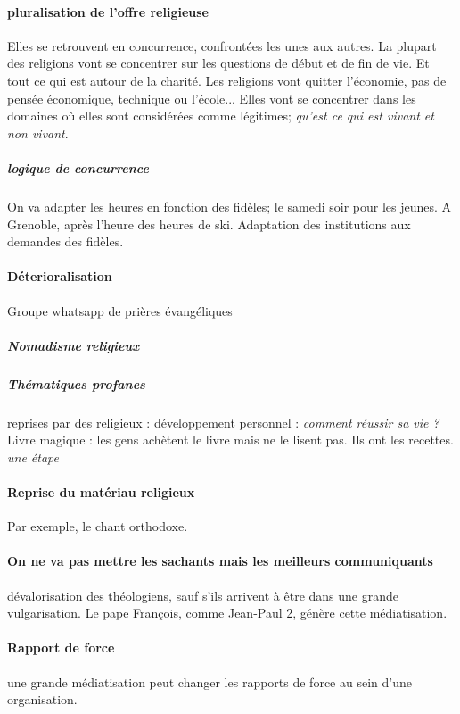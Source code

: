 \paragraph{ pluralisation de l’offre religieuse} Elles se retrouvent en concurrence, confrontées les unes aux autres. La plupart des religions vont se concentrer sur les questions de début et de fin de vie. Et tout ce qui est autour de la charité. Les religions vont quitter l'économie, pas de pensée économique, technique ou l'école...
Elles vont se concentrer dans les domaines où elles sont considérées comme légitimes; \textit{qu'est ce qui est vivant et non vivant}.

\subparagraph{logique de concurrence }
\begin{Ex}
On va adapter les heures en fonction des fidèles; le samedi soir pour les jeunes. A Grenoble, après l'heure des heures de ski. Adaptation des institutions aux demandes des fidèles.
\end{Ex}

\paragraph{Déterioralisation} Groupe whatsapp de prières évangéliques


\subparagraph{Nomadisme religieux}


\subparagraph{Thématiques profanes} reprises par des religieux : développement personnel : \textit{comment réussir sa vie ?} Livre magique : les gens achètent le livre mais ne le lisent pas. Ils ont les recettes. \textit{une étape}

\paragraph{Reprise du matériau religieux} Par exemple, le chant orthodoxe.

\paragraph{On ne va pas mettre les sachants mais les meilleurs communiquants} dévalorisation des théologiens, sauf s'ils arrivent à être dans une grande vulgarisation. Le pape François, comme Jean-Paul 2, génère cette médiatisation.

\paragraph{Rapport de force} une grande médiatisation peut changer les rapports de force au sein d'une organisation.


